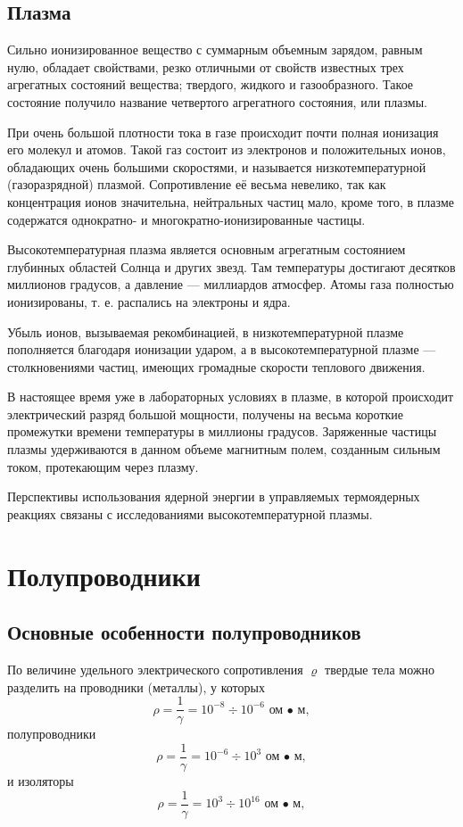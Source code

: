 \documentclass[a4paper,10pt]{book}
\begin{document}
\section{Плазма}

Сильно ионизированное вещество с суммарным объемным зарядом, равным нулю, обладает свойствами, резко отличными от свойств известных трех агрегатных состояний вещества; твердого, жидкого и газообразного. Такое состояние получило название четвертого агрегатного состояния, или плазмы.

При очень большой плотности тока в газе происходит почти полная ионизация его молекул и атомов. Такой газ состоит из электронов и положительных ионов, обладающих очень большими скоростями, и называется низкотемпературной (газоразрядной) плазмой. Сопротивление её весьма невелико, так как концентрация ионов значительна, нейтральных частиц мало, кроме того, в плазме содержатся однократно- и многократно-ионизированные частицы.

Высокотемпературная плазма является основным агрегатным состоянием глубинных областей Солнца и других звезд. Там температуры достигают десятков миллионов градусов, а давление — миллиардов атмосфер. Атомы газа полностью ионизированы, т. е. распались на электроны и ядра.

Убыль ионов, вызываемая рекомбинацией, в низкотемпературной плазме пополняется благодаря ионизации ударом, а в высокотемпературной плазме — столкновениями частиц, имеющих громадные скорости теплового движения.

В настоящее время уже в лабораторных условиях в плазме, в которой происходит электрический разряд большой мощности, получены на весьма короткие промежутки времени температуры в миллионы градусов. Заряженные частицы плазмы удерживаются в данном объеме магнитным полем, созданным сильным током, протекающим через плазму.

Перспективы использования ядерной энергии в управляемых термоядерных реакциях связаны с исследованиями высокотемпературной плазмы.

\chapter{Полупроводники}
\section{Основные особенности полупроводников}

По величине удельного электрического сопротивления $\varrho$ твердые тела можно разделить на проводники (металлы), у которых\begin{equation*}
\rho = \frac{1}{\gamma} = 10^{-8} \div 10^{-6} \textit{ ом • м},
\end{equation*}
полупроводники\begin{equation*}
\rho = \frac{1}{\gamma} = 10^{-6} \div 10^{3} \textit{ ом • м},
\end{equation*}
и изоляторы
\begin{equation*}
\rho = \frac{1}{\gamma} = 10^{3} \div 10^{16} \textit{ ом • м},
\end{equation*}
\end{document}
